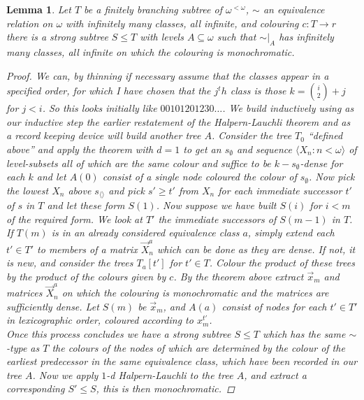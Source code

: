 \documentclass[a4paper,11pt]{article}
\newtheorem{lem}{Lemma}
\begin{document}
\begin{lem}
Let $T$ be a finitely branching subtree of $\omega ^{<\omega}$, $\sim$ an equivalence relation on $\omega$ with infinitely many classes, all infinite, and colouring $c: T \to r$ there is a strong subtree $S\leq T$ with levels $A\subseteq \omega$ such that $\sim |_A$ has infinitely many classes, all infinite on which the colouring is monochromatic.
\begin{proof}
We can, by thinning if necessary assume that the classes appear in a specified order, for which I have chosen that the $j^th$ class is those $k=\binom{i}{2} +j$ for $j<i$. So this looks initially like $00101201230\ldots$. We build inductively using as our inductive step the earlier restatement of the Halpern-Lauchli theorem and as a record keeping device will build another tree $A$. Consider the tree $T_0$ ``defined above'' and apply the theorem with $d=1$ to get an $s_{\emptyset}$ and sequence $\langle X_n : n<\omega \rangle$ of level-subsets all of which are the same colour and suffice to be $k-s_{\emptyset}$-dense for each $k$ and let $A(0)$ consist of a single node coloured the colour of $s_{\emptyset}$. Now pick the lowest $X_n$ above $s_{\langle \rangle}$ and pick $s' \geq t'$ from $X_n$ for each immediate successor $t'$ of $s$ in $T$ and let these form $S(1)$. Now suppose we have built $S(i)$ for $i<m$ of the required form. We look at $T'$ the immediate successors of $S(m-1)$ in $T$. If $T(m)$ is in an already considered equivalence class $a$, simply extend each $t'\in T'$ to members of a matrix $\vec{X}^a_n$ which can be done as they are dense. If not, it is new, and consider the trees $T_a[t']$ for $t' \in T$. Colour the product of these trees by the product of the colours given by $c$. By the theorem above extract $\vec{x}_m$ and matrices $\vec{X}^a_n$ on which the colouring is monochromatic and the matrices are sufficiently dense. Let $S(m)$ be $\vec{x}_m$, and $A(a)$ consist of nodes for each $t'\in T'$ in lexicographic order, coloured according to $x_m^{t'}$. \\
Once this process concludes we have a strong subtree $S\leq T$ which has the same $\sim$-type as $T$ the colours of the nodes of which are determined by the colour of the earliest predecessor in the same equivalence class, which have been recorded in our tree $A$. Now we apply $1$-d Halpern-Lauchli to the tree $A$, and extract a corresponding $S'\leq S$, this is then monochromatic. 
\end{proof}
\end{lem}
\end{document}
